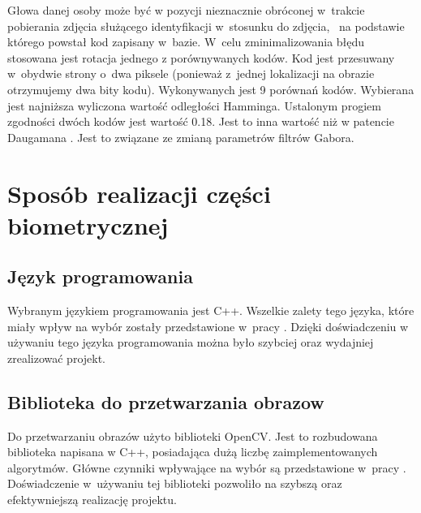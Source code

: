 Głowa danej osoby może być w pozycji nieznacznie obróconej w~trakcie pobierania zdjęcia służącego identyfikacji w~stosunku do zdjęcia, ~na podstawie  którego powstał kod zapisany  w~bazie. W~celu zminimalizowania błędu stosowana jest rotacja jednego z porównywanych kodów. Kod jest przesuwany w~obydwie strony o~dwa piksele (ponieważ z~jednej lokalizacji na obrazie otrzymujemy dwa bity kodu). Wykonywanych jest 9 porównań kodów. Wybierana jest najniższa wyliczona wartość odległości Hamminga. Ustalonym progiem zgodności dwóch kodów jest wartość 0.18. Jest to inna wartość niż w patencie Daugamana \cite{Daugman}. Jest to związane ze zmianą parametrów filtrów Gabora.

\section{Sposób realizacji części biometrycznej}
\label{subsec:realizacjaBio}

\subsection{Język programowania}
\label{sec:jezykProgramowania}
Wybranym językiem programowania jest C++. Wszelkie zalety tego języka, które miały wpływ na wybór zostały przedstawione w~pracy \cite{Gl11}. Dzięki doświadczeniu w używaniu tego języka programowania można było szybciej oraz wydajniej zrealizować projekt.

\subsection{Biblioteka do przetwarzania obrazow}
\label{sec:bibliotekaObrazow}
Do przetwarzaniu obrazów użyto biblioteki OpenCV. Jest to rozbudowana biblioteka napisana w C++, posiadająca dużą liczbę zaimplementowanych algorytmów. Główne czynniki wpływające na wybór są przedstawione w~pracy \cite{Gl11}. Doświadczenie w~używaniu tej biblioteki pozwoliło na szybszą oraz efektywniejszą realizację projektu.


